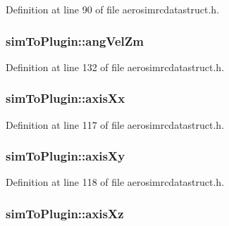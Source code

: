 Definition at line 90 of file aerosimrcdatastruct.\-h.

\hypertarget{group___aero_sim_r_c_ga4387cb264fd400cd98815e6145b8114c}{
\subsubsection[{ang\-Vel\-Zm}]{ sim\-To\-Plugin\-::ang\-Vel\-Zm}}\label{group___aero_sim_r_c_ga4387cb264fd400cd98815e6145b8114c}


Definition at line 132 of file aerosimrcdatastruct.\-h.

\hypertarget{group___aero_sim_r_c_ga693a3fedba573cb60ae2ced78f2f55e8}{
\subsubsection[{axis\-Xx}]{ sim\-To\-Plugin\-::axis\-Xx}}\label{group___aero_sim_r_c_ga693a3fedba573cb60ae2ced78f2f55e8}


Definition at line 117 of file aerosimrcdatastruct.\-h.

\hypertarget{group___aero_sim_r_c_gaf149495ae6cb0a4b55f124b645e0cc8d}{
\subsubsection[{axis\-Xy}]{ sim\-To\-Plugin\-::axis\-Xy}}\label{group___aero_sim_r_c_gaf149495ae6cb0a4b55f124b645e0cc8d}


Definition at line 118 of file aerosimrcdatastruct.\-h.

\hypertarget{group___aero_sim_r_c_gaf6a11ab25129a46c7195678d223f8cba}{
\subsubsection[{axis\-Xz}]{ sim\-To\-Plugin\-::axis\-Xz}}\label{group___aero_sim_r_c_gaf6a11ab25129a46c7195678d223f8cba}


